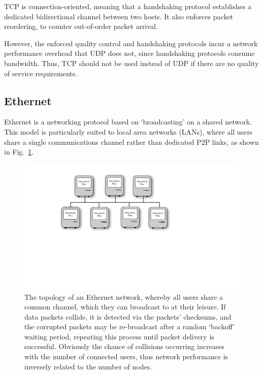 \documentclass[aps, rmp, twocolumn, amsmath, amssymb, nofootinbib, superscriptaddress, longbibliography, floatfix, table-of-contents, eqsecnum]{revtex4-1}
\begin{document}
TCP is connection-oriented, meaning that a handshaking protocol establishes a dedicated bidirectional channel between two hosts. It also enforces packet reordering, to counter out-of-order packet arrival.

However, the enforced quality control and handshaking protocols incur a network performance overhead that UDP does not, since handshaking protocols consume bandwidth. Thus, TCP should not be used instead of UDP if there are no quality of service requirements.

%
%

\subsection{Ethernet} 

Ethernet is a networking protocol based on `broadcasting' on a shared network. This model is particularly suited to local area networks (LANs), where all users share a single communications channel rather than dedicated P2P links, as shown in Fig.~\ref{fig:ethernet}.

\begin{figure}[!htb]
	\includegraphics[width=\columnwidth]{ethernet}
	\caption{The topology of an Ethernet network, whereby all users share a common channel, which they can broadcast to at their leisure. If data packets collide, it is detected via the packets' checksums, and the corrupted packets may be re-broadcast after a random `backoff' waiting period, repeating this process until packet delivery is successful. Obviously the chance of collisions occurring increases with the number of connected users, thus network performance is inversely related to the number of nodes.} \label{fig:ethernet}
\end{figure}
\end{document}
